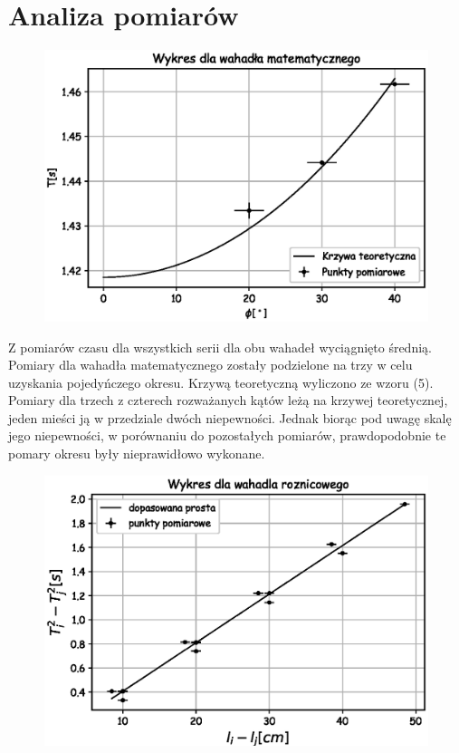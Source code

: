 \documentclass[a4paper,10pt]{article}
\begin{document}
\section{Analiza pomiarów}
\begin{figure}[H]
    \includegraphics{./Wykres_matematyczne.eps}
    \caption{}
    \label{}
\end{figure}
Z pomiarów czasu dla wszystkich serii dla obu wahadeł wyciągnięto średnią. Pomiary dla wahadła matematycznego zostały podzielone na trzy w celu uzyskania pojedyńczego okresu. Krzywą teoretyczną wyliczono ze wzoru (5). Pomiary dla trzech z czterech rozważanych kątów leżą na krzywej teoretycznej, jeden mieści ją w przedziale dwóch niepewności. Jednak biorąc pod uwagę skalę jego niepewności, w porównaniu do pozostałych pomiarów, prawdopodobnie te pomary okresu były nieprawidłowo wykonane.
\begin{figure}[H]
    \includegraphics{./Wykres_roznicowe.eps}
    \caption{}
    \label{}
\end{figure}
\end{document}
